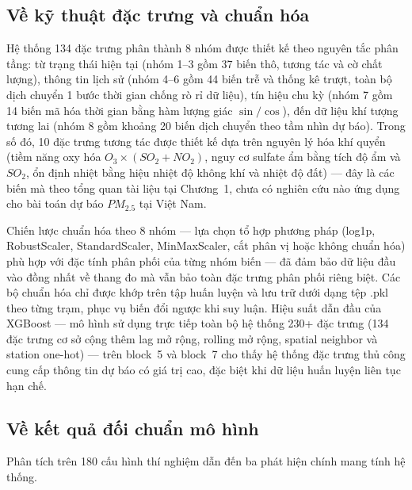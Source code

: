 \subsection{Về kỹ thuật đặc trưng và chuẩn hóa}

Hệ thống 134 đặc trưng phân thành 8 nhóm được thiết kế theo nguyên tắc phân tầng: từ trạng thái hiện tại (nhóm 1--3 gồm 37 biến thô, tương tác và cờ chất lượng), thông tin lịch sử (nhóm 4--6 gồm 44 biến trễ và thống kê trượt, toàn bộ dịch chuyển 1 bước thời gian chống rò rỉ dữ liệu), tín hiệu chu kỳ (nhóm 7 gồm 14 biến mã hóa thời gian bằng hàm lượng giác $\sin/\cos$), đến dữ liệu khí tượng tương lai (nhóm 8 gồm khoảng 20 biến dịch chuyển theo tầm nhìn dự báo). Trong số đó, 10 đặc trưng tương tác được thiết kế dựa trên nguyên lý hóa khí quyển (tiềm năng oxy hóa $O_3 \times (SO_2 + NO_2)$, nguy cơ sulfate ẩm bằng tích độ ẩm và $SO_2$, ổn định nhiệt bằng hiệu nhiệt độ không khí và nhiệt độ đất) --- đây là các biến mà theo tổng quan tài liệu tại Chương~1, chưa có nghiên cứu nào ứng dụng cho bài toán dự báo $PM_{2.5}$ tại Việt Nam.

Chiến lược chuẩn hóa theo 8 nhóm --- lựa chọn tổ hợp phương pháp (log1p, RobustScaler, StandardScaler, MinMaxScaler, cắt phân vị hoặc không chuẩn hóa) phù hợp với đặc tính phân phối của từng nhóm biến --- đã đảm bảo dữ liệu đầu vào đồng nhất về thang đo mà vẫn bảo toàn đặc trưng phân phối riêng biệt. Các bộ chuẩn hóa chỉ được khớp trên tập huấn luyện và lưu trữ dưới dạng tệp .pkl theo từng trạm, phục vụ biến đổi ngược khi suy luận. Hiệu suất dẫn đầu của XGBoost --- mô hình sử dụng trực tiếp toàn bộ hệ thống 230+ đặc trưng (134 đặc trưng cơ sở cộng thêm lag mở rộng, rolling mở rộng, spatial neighbor và station one-hot) --- trên block~5 và block~7 cho thấy hệ thống đặc trưng thủ công cung cấp thông tin dự báo có giá trị cao, đặc biệt khi dữ liệu huấn luyện liên tục hạn chế.

\subsection{Về kết quả đối chuẩn mô hình}

Phân tích trên 180 cấu hình thí nghiệm dẫn đến ba phát hiện chính mang tính hệ thống.


